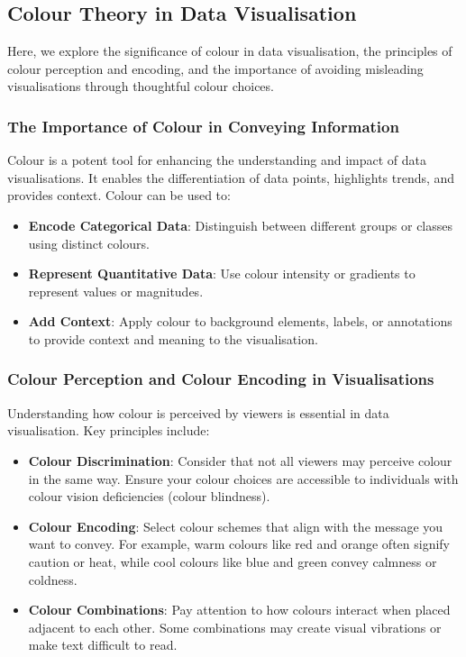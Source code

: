 \documentclass{article}\usepackage[]{graphicx}\usepackage[]{xcolor}
\begin{document}
\subsection{Colour Theory in Data Visualisation}
Here, we explore the significance of colour in data visualisation, the principles of colour perception and encoding, and the importance of avoiding misleading visualisations through thoughtful colour choices.

\subsubsection{The Importance of Colour in Conveying Information}
Colour is a potent tool for enhancing the understanding and impact of data visualisations. It enables the differentiation of data points, highlights trends, and provides context. Colour can be used to:
\begin{itemize}
    \item \textbf{Encode Categorical Data}: Distinguish between different groups or classes using distinct colours.
    \item \textbf{Represent Quantitative Data}: Use colour intensity or gradients to represent values or magnitudes.
    \item \textbf{Add Context}: Apply colour to background elements, labels, or annotations to provide context and meaning to the visualisation.
\end{itemize}

\subsubsection{Colour Perception and Colour Encoding in Visualisations}
Understanding how colour is perceived by viewers is essential in data visualisation. Key principles include:
\begin{itemize}
    \item \textbf{Colour Discrimination}: Consider that not all viewers may perceive colour in the same way. Ensure your colour choices are accessible to individuals with colour vision deficiencies (colour blindness).
    \item \textbf{Colour Encoding}: Select colour schemes that align with the message you want to convey. For example, warm colours like red and orange often signify caution or heat, while cool colours like blue and green convey calmness or coldness.
    \item \textbf{Colour Combinations}: Pay attention to how colours interact when placed adjacent to each other. Some combinations may create visual vibrations or make text difficult to read.
\end{itemize}
\end{document}
